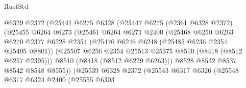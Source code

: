 \begin{lexlean}{RustStd}
\begin{coremodule}
                                    @6329
                                    @2372
                                    (@25441
                                      @6275
                                      @6328
                                      (@25447
                                        @6275
                                        (@2361 @6328 @2372)
                                        (@25455
                                          @6264
                                          @6273
                                          (@25461
                                            @6264
                                            @6271
                                            @2400
                                            (@25468
                                              @6250
                                              @6263
                                              @6270
                                              @2377
                                              @6228
                                              @2354
                                              (@25476 @6246 @6248 (@25485 @6236 @2354 @25495 @8801))
                                              (@25507
                                                @6256
                                                @2354
                                                @25513
                                                @25375
                                                @8510
                                                (@8418 (@8512 @6257 @2395)))
                                              @8510
                                              (@8418 (@8512 @6229 @6263)))
                                            @8528
                                            @8532
                                            @8537
                                            @8542
                                            @8548
                                            @8555))
                                        (@25539
                                          @6328
                                          @2372
                                          (@25543
                                            @6317
                                            @6326
                                            (@25548
                                              @6317
                                              @6324
                                              @2400
                                              (@25555
                                                @6303

\end{coremodule}
\end{lexlean}
